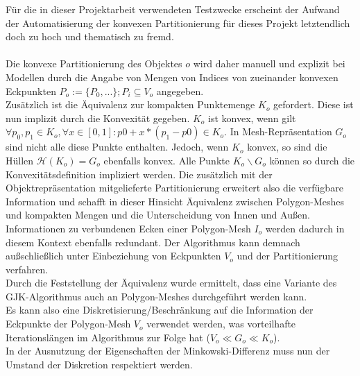 Für die in dieser Projektarbeit verwendeten Testzwecke erscheint der Aufwand der Automatisierung der konvexen Partitionierung für dieses Projekt letztendlich doch zu hoch und thematisch zu fremd.\\
\ \\
Die konvexe Partitionierung des Objektes $o$ wird daher manuell und explizit bei Modellen durch die Angabe von Mengen von Indices von zueinander konvexen Eckpunkten $P_o := \{P_0, ...\}; P_i \subseteq V_o$ angegeben.\\
Zusätzlich ist die Äquivalenz zur kompakten Punktemenge $K_o$ gefordert. Diese ist nun implizit durch die Konvexität gegeben. $K_o$ ist konvex, wenn gilt $\forall p_0, p_1 \in K_o, \forall x \in [0,1] : p0 + x * (p_1 - p0) \in K_o $. In Mesh-Repräsentation $G_o$ sind nicht alle diese Punkte enthalten. Jedoch, wenn $K_o$ konvex, so sind die Hüllen $\mathcal{H}(K_o) = G_o$ ebenfalls konvex. Alle Punkte $K_o \backslash G_o$ können so durch die Konvexitätsdefinition impliziert werden. Die zusätzlich mit der Objektrepräsentation mitgelieferte Partitionierung erweitert also die verfügbare Information und schafft in dieser Hinsicht Äquivalenz zwischen Polygon-Meshes und kompakten Mengen und die Unterscheidung von Innen und Außen. Informationen zu verbundenen Ecken einer Polygon-Mesh $I_o$ werden dadurch in diesem Kontext ebenfalls redundant. Der Algorithmus kann demnach außschließlich unter Einbeziehung von Eckpunkten $V_o$ und der Partitionierung verfahren.\\
Durch die Feststellung der Äquivalenz wurde ermittelt, dass eine Variante des GJK-Algorithmus auch an Polygon-Meshes durchgeführt werden kann.\\
Es kann also eine Diskretisierung/Beschränkung auf die Information der Eckpunkte der Polygon-Mesh $V_o$  verwendet werden, was vorteilhafte Iterationslängen im Algorithmus zur Folge hat ($V_o \ll G_o \ll K_o$).\\
In der Ausnutzung der Eigenschaften der Minkowski-Differenz muss nun der Umstand der Diskretion respektiert werden.

